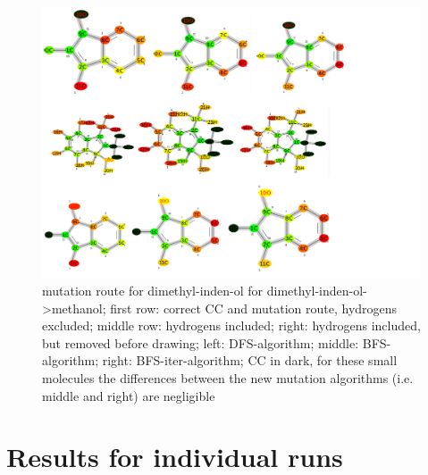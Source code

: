 \begin{figure}[H]
	
	\includegraphics[scale=0.75]{dimethylindenol_set2}\caption{mutation route for dimethyl-inden-ol for dimethyl-inden-ol->methanol; first row: correct CC and mutation route, hydrogens excluded; middle row: hydrogens included; right: hydrogens included, but removed before drawing; left: DFS-algorithm; middle: BFS-algorithm; right: BFS-iter-algorithm; CC in dark, for these small molecules the differences between the new mutation algorithms (i.e. middle and right) are negligible}
	
\end{figure}





\section{Results for individual runs}

